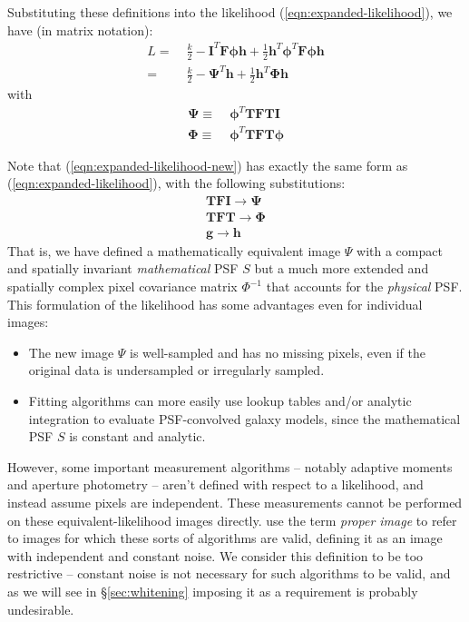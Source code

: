 \documentclass[10pt]{article}
\newcommand{\eqnref}[1]{(\ref{eqn:#1})}
\newcommand{\secref}[1]{\S\ref{sec:#1}}
\begin{document}
Substituting these definitions into the likelihood \eqnref{expanded-likelihood}, we have (in matrix notation):
\begin{align}
L
=\;&
    \frac{k}{2} - \bm{I}^T \! \bm{F} \bm{\phi} \bm{h}
    + \frac{1}{2} \bm{h}^T \! \bm{\phi}^T \! \bm{F} \bm{\phi} \bm{h} \\
=\;& \frac{k}{2} - \bm{\Psi}^T\!\bm{h} + \frac{1}{2}\bm{h}^T\!\bm{\Phi}\bm{h}
\label{eqn:expanded-likelihood-new}
\end{align}
with
\begin{align}
\bm{\Psi} \equiv\;& \bm{\phi}^T\!\bm{T} \bm{F} \bm{T} \bm{I}
    \label{eqn:psi-def}
    \\
\bm{\Phi} \equiv\;& \bm{\phi}^T\!\bm{T} \bm{F} \bm{T} \bm{\phi}
\label{eqn:phi-def}
\end{align}

Note that \eqnref{expanded-likelihood-new} has exactly the same form as \eqnref{expanded-likelihood}, with the following substitutions:
\begin{align}
\bm{T}\bm{F}\bm{I} \longrightarrow  \bm{\Psi} \label{eqn:image-translate} \\
\bm{T}\bm{F}\bm{T} \longrightarrow \bm{\Phi} \label{eqn:covar-translate} \\
\bm{g} \longrightarrow \bm{h} \label{eqn:model-translate}
\end{align}
That is, we have defined a mathematically equivalent image $\Psi$ with a compact and spatially invariant \emph{mathematical} PSF $S$ but a much more extended and spatially complex pixel covariance matrix $\Phi^{-1}$ that accounts for the \emph{physical} PSF.  This formulation of the likelihood has some advantages even for individual images:
\begin{itemize}
\item The new image $\Psi$ is well-sampled and has no missing pixels, even if the original data is undersampled or irregularly sampled.
\item Fitting algorithms can more easily use lookup tables and/or analytic integration to evaluate PSF-convolved galaxy models, since the mathematical PSF $S$ is constant and analytic.
\end{itemize}

However, some important measurement algorithms -- notably adaptive moments and aperture photometry -- aren't defined with respect to a likelihood, and instead assume pixels are independent.  These measurements cannot be performed on these equivalent-likelihood images directly.  \cite{2015arXiv151206879Z} use the term \emph{proper image} to refer to images for which these sorts of algorithms are valid, defining it as an image with independent and constant noise.  We consider this definition to be too restrictive -- constant noise is not necessary for such algorithms to be valid, and as we will see in \secref{whitening} imposing it as a requirement is probably undesirable.
\end{document}
